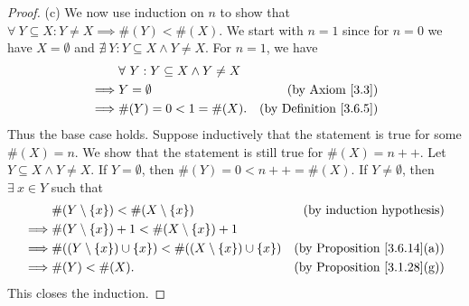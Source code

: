 \begin{proof}{(c)}
    We now use induction on \(n\) to show that \(\forall\ Y \subseteq X : Y \neq X \implies \#(Y) < \#(X)\).
    We start with \(n = 1\) since for \(n = 0\) we have \(X = \emptyset\) and \(\nexists\ Y : Y \subseteq X \land Y \neq X\).
    For \(n = 1\), we have
    \begin{align*}
                 & \forall\ Y : Y \subseteq X \land Y \neq X                                      \\
        \implies & Y = \emptyset                             & \text{(by Axiom \ref{3.3})}        \\
        \implies & \#(Y) = 0 < 1 = \#(X).                    & \text{(by Definition \ref{3.6.5})}
    \end{align*}
    Thus the base case holds.
    Suppose inductively that the statement is true for some \(\#(X) = n\).
    We show that the statement is still true for \(\#(X) = n++\).
    Let \(Y \subseteq X \land Y \neq X\).
    If \(Y = \emptyset\), then \(\#(Y) = 0 < n++ = \#(X)\).
    If \(Y \neq \emptyset\), then \(\exists\ x \in Y\) such that
    \begin{align*}
                 & \#(Y \setminus \{x\}) < \#(X \setminus \{x\})                           & \text{(by induction hypothesis)}        \\
        \implies & \#(Y \setminus \{x\}) + 1 < \#(X \setminus \{x\}) + 1                                                             \\
        \implies & \#((Y \setminus \{x\}) \cup \{x\}) < \#((X \setminus \{x\}) \cup \{x\}) & \text{(by Proposition \ref{3.6.14}(a))} \\
        \implies & \#(Y) < \#(X).                                                          & \text{(by Proposition \ref{3.1.28}(g))}
    \end{align*}
    This closes the induction.
\end{proof}

